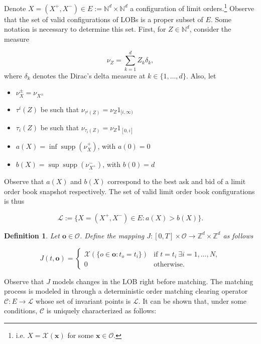\documentclass[10pt,a4paper,oneside]{article}
\newcommand{\N}{\mathbb{N}}
\newcommand{\Z}{\mathbb{Z}}
\newcommand{\Bo}{\mathcal{L}}
\newtheorem{definition}{Definition}
\DeclareMathOperator{\support}{supp}
\begin{document}
Denote $X = (X^+, X^-) \in E := \N^d \times \N^d$ a configuration of limit orders.\footnote{i.e. $X = \mathcal{X}(\mathbf{x})$ for some $\mathbf{x} \in \mathcal{O}$.}  Observe that the set of valid configurations of LOBs is a proper subset of $E$. Some notation is necessary to determine this set. First, for $Z \in \N^d$, consider the measure 

$$
\nu_Z = \sum^d_{k = 1}Z_k \delta_k,
$$
where $\delta_k$ denotes the Dirac's delta measure at $k \in \{1, \dots, d \}$. Also, let

\begin{itemize}
    \item $\nu^{\pm}_X = \nu_{X^{\pm}}$
    \item $\tau^i(Z)$ be such that $\nu_{\tau^i(Z)} = \nu_Z 1_{[i, \infty)}$
    \item $\tau_i(Z)$ be such that $\nu_{\tau_i(Z)} = \nu_Z 1_{[0, i]}$
    \item $a(X) = \inf \support(\nu^+_{X})$, with $a(0) = 0$
    \item $b(X) = \sup \support(\nu^-_{X^+})$, with $b(0) = d$
\end{itemize}

Observe that $a(X)$ and $b(X)$ correspond to the best ask and bid of a limit order book snapshot respectively. The set of valid limit order book configurations is thus

$$
\Bo := \{X = (X^+, X^-) \in E : a(X) > b(X)\}.
$$

\begin{definition}
    Let $\mathbf{o} \in \mathcal{O}$. Define the mapping $J : [0, T] \times \mathcal{O} \rightarrow \Z^d \times \Z^d$ as follows

    \begin{equation*}
    J(t, \mathbf{o}) = \begin{cases}
        \mathcal{X}(\{ o \in \mathbf{o} : t_o = t_i  \}) & \text{if } t = t_{i} \ \exists  i = 1, \dots, N,\\
        0                        & \text{otherwise.}
    \end{cases}
\end{equation*}
    
\end{definition}

Observe that $J$ models changes in the LOB right before matching. The matching process is modeled in \cite{cont2023mathematical} through a deterministic order matching clearing operator $\mathcal{C} : E \rightarrow \Bo$ whose set of invariant points is $\Bo$. It can be shown that, under some conditions, $\mathcal{C}$ is uniquely characterized as follows:
\end{document}
